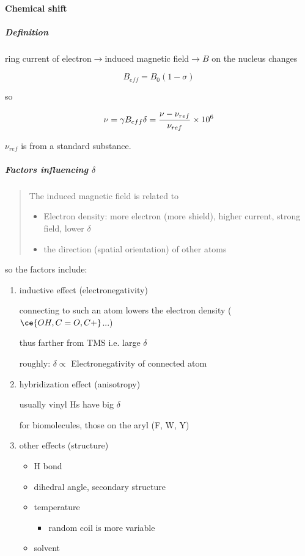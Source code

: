 \documentclass[]{article}
\let\oldparagraph\paragraph
\renewcommand{\paragraph}[1]{\oldparagraph{#1}\mbox{}}
\let\oldsubparagraph\subparagraph
\renewcommand{\subparagraph}[1]{\oldsubparagraph{#1}\mbox{}}
\begin{document}
\hypertarget{chemical-shift}{%
\paragraph{Chemical shift}\label{chemical-shift}}

\hypertarget{definition}{%
\subparagraph{Definition}\label{definition}}

ring current of electron\(\longrightarrow\)induced magnetic
field\(\longrightarrow\)\(B\) on the nucleus changes

\[B_{eff}=B_0(1-\sigma)\]

so

\[\nu=\gamma B_{eff}\\
\delta=\dfrac{\nu-\nu_{ref}}{\nu_{ref}}\times 10^{6}\]

\(\nu_{ref}\) is from a standard substance.

\hypertarget{factors-influencing}{%
\subparagraph{\texorpdfstring{Factors influencing
\(\delta\)}{Factors influencing \textbackslash{}delta}}\label{factors-influencing}}

\begin{quote}
The induced magnetic field is related to

\begin{itemize}
\item
  Electron density: more electron (more shield), higher current, strong
  field, lower \(\delta\)
\item
  the direction (spatial orientation) of other atoms
\end{itemize}
\end{quote}

so the factors include:

\begin{enumerate}
\def\labelenumi{\arabic{enumi}.}
\item
  inductive effect (electronegativity)

  connecting to such an atom lowers the electron density
  (\(\ce{OH,C=O,C+}\)...)

  thus farther from TMS i.e. large \(\delta\)

  roughly: \(\delta \propto \) Electronegativity of connected atom
\item
  hybridization effect (anisotropy)

  usually vinyl Hs have big \(\delta\)

  for biomolecules, those on the aryl (F, W, Y)
\item
  other effects (structure)

  \begin{itemize}
  \item
    H bond
  \item
    dihedral angle, secondary structure
  \item
    temperature

    \begin{itemize}
    \item
      random coil is more variable
    \end{itemize}
  \item
    solvent
  \end{itemize}
\end{enumerate}
\end{document}
